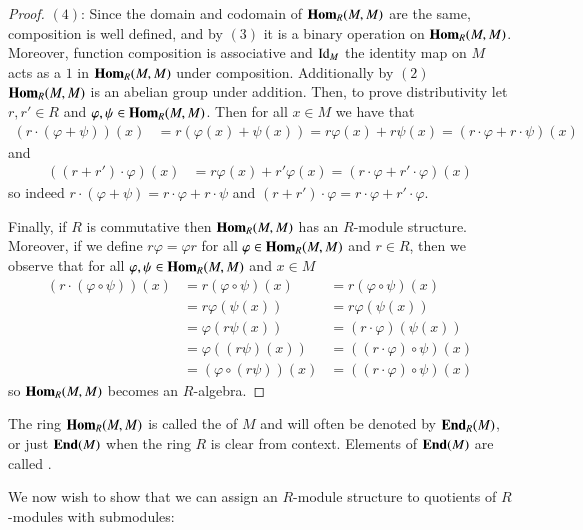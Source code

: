 \begin{proof}
    $(4)$: Since the domain and codomain of $\mathbf{Hom}_R(M,M)$ are the same, composition is well defined, and by $(3)$ it is a binary operation on $\mathbf{Hom}_R(M,M)$. Moreover, function composition is associative and $\operatorname{Id}_M$ the identity map on $M$ acts as a $1$ in $\mathbf{Hom}_R(M,M)$ under composition. Additionally by $(2)$ $\mathbf{Hom}_R(M,M)$ is an abelian group under addition. Then, to prove distributivity let $r,r' \in R$ and $\varphi,\psi \in \mathbf{Hom}_R(M,M)$. Then for all $x \in M$ we have that \begin{align*}
        (r\cdot(\varphi+\psi))(x) &= r(\varphi(x)+\psi(x)) = r\varphi(x)+r\psi(x) = (r\cdot\varphi+r\cdot\psi)(x)
    \end{align*}
    and \begin{align*}
        ((r+r')\cdot\varphi)(x) &= r\varphi(x)+r'\varphi(x) = (r\cdot\varphi+r'\cdot\varphi)(x)
    \end{align*}
    so indeed $r\cdot(\varphi+\psi) = r\cdot\varphi+r\cdot\psi$ and $(r+r')\cdot\varphi = r\cdot\varphi+r'\cdot\varphi$.
    
    Finally, if $R$ is commutative then $\mathbf{Hom}_R(M,M)$ has an $R$-module structure. Moreover, if we define $r\varphi = \varphi r$ for all $\varphi \in \mathbf{Hom}_R(M,M)$ and $r \in R$, then we observe that for all $\varphi,\psi \in \mathbf{Hom}_R(M,M)$ and $x \in M$ \begin{align*}
        (r\cdot(\varphi\circ\psi))(x) &=r(\varphi\circ\psi)(x) &= r(\varphi\circ\psi)(x) \\
        &=r\varphi(\psi(x))  &= r\varphi(\psi(x)) \\ 
        &= \varphi(r\psi(x)) &= (r\cdot\varphi)(\psi(x)) \\
        &= \varphi((r\psi)(x)) &= ((r\cdot\varphi)\circ\psi)(x) \\
        &= (\varphi\circ(r\psi))(x) &= ((r\cdot\varphi)\circ\psi)(x) 
    \end{align*}
    so $\mathbf{Hom}_R(M,M)$ becomes an $R$-algebra.
\end{proof}


\begin{defn}
    The ring $\mathbf{Hom}_R(M,M)$ is called the  of $M$ and will often be denoted by $\normalfont\textbf{End}_R(M)$, or just $\normalfont\textbf{End}(M)$ when the ring $R$ is clear from context. Elements of $\normalfont\textbf{End}(M)$ are called .
\end{defn}

We now wish to show that we can assign an $R$-module structure to quotients of $R$-modules with submodules:

